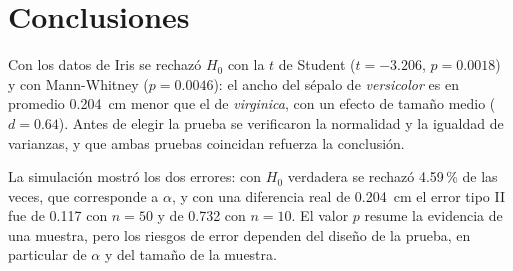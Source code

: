 \documentclass[11pt,letterpaper]{article}
\begin{document}
\section{Conclusiones}

Con los datos de Iris se rechazó $H_0$ con la $t$ de Student ($t = -3.206$, $p = 0.0018$) y con Mann-Whitney ($p = 0.0046$): el ancho del sépalo de \textit{versicolor} es en promedio 0.204~cm menor que el de \textit{virginica}, con un efecto de tamaño medio ($d = 0.64$). Antes de elegir la prueba se verificaron la normalidad y la igualdad de varianzas, y que ambas pruebas coincidan refuerza la conclusión.

La simulación mostró los dos errores: con $H_0$ verdadera se rechazó 4.59\,\% de las veces, que corresponde a $\alpha$, y con una diferencia real de 0.204~cm el error tipo II fue de 0.117 con $n = 50$ y de 0.732 con $n = 10$. El valor $p$ resume la evidencia de una muestra, pero los riesgos de error dependen del diseño de la prueba, en particular de $\alpha$ y del tamaño de la muestra.

\end{document}

